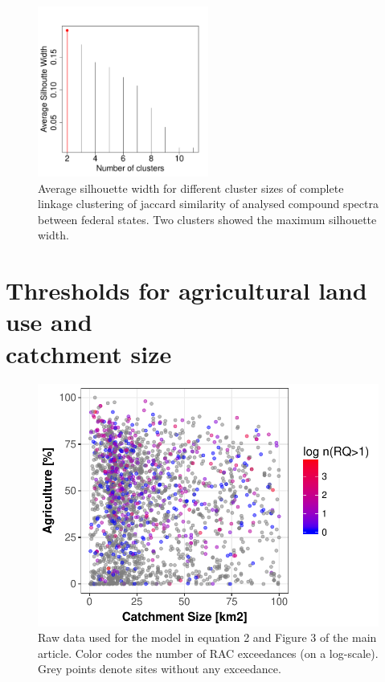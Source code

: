 \begin{figure}[h]
	\centering
	\vspace{-1.5cm} 
	\includegraphics[width = 0.5\textwidth]{appendix/smallstreams/one/silhouette}
	\caption[Average silhouette width for different cluster sizes.]{Average silhouette width for different cluster sizes of complete linkage clustering of jaccard similarity of analysed compound spectra between federal states. Two clusters showed the maximum silhouette width.}
	\label{fig:silhouette}
\end{figure}

\clearpage
\footnotesize





\clearpage
\section[Thresholds for agricultural land use and catchment size]{\texorpdfstring{Thresholds for agricultural land use and \\ catchment size}{Thresholds for agricultural land use and catchment size}}
\begin{figure}[h]
	\includegraphics[width = \textwidth]{appendix/smallstreams/one/ezgagrirac}
	\caption[Raw data used for the model in equation 3.2 and Figure 3.4 of the main article.]{Raw data used for the model in equation 2 and Figure 3 of the main article. Color codes the number of RAC exceedances (on a log-scale). Grey points denote sites without any exceedance.}
	\label{fig:ezgagrirac}
\end{figure}



